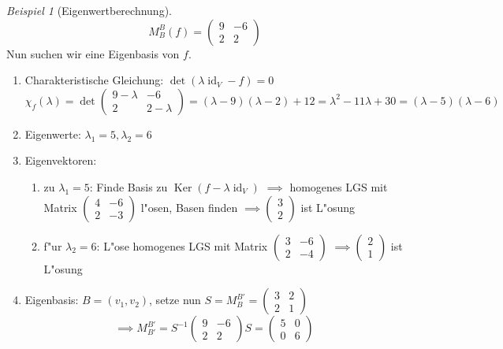 \documentclass[11pt]{article}
\DeclareMathOperator{\mKer}{Ker}
\DeclareMathOperator{\mId}{id}
\theoremstyle{remark}
\newtheorem{exa}{Beispiel}[section]
\theoremstyle{definition}
\theoremstyle{remark}
\begin{document}
\begin{exa}[Eigenwertberechnung]
  \[M^B_B(f) =
    \begin{pmatrix}
      9 & -6 \\
      2 & 2
    \end{pmatrix}\]
  Nun suchen wir eine Eigenbasis von \(f\).
  \begin{enumerate}
  \item Charakteristische Gleichung: \(\det(\lambda\mId_V-f)=0\)
    \[\chi_f(\lambda) = \det\begin{pmatrix}9-\lambda & -6 \\ 2 & 2-\lambda\end{pmatrix} = (\lambda - 9)(\lambda - 2) + 12 = \lambda^2 - 11\lambda + 30 = (\lambda-5)(\lambda-6)\]
  \item Eigenwerte: \(\lambda_1 = 5, \lambda_2 = 6\)
  \item Eigenvektoren:
    \begin{enumerate}
    \item zu \(\lambda_1 = 5\): Finde Basis zu \(\mKer(f - \lambda\mId_V)\) \(\implies\) homogenes LGS mit Matrix \(
        \begin{pmatrix}
          4 & -6 \\
          2 & -3
        \end{pmatrix}
      \) l"osen, Basen finden \(\implies\begin{pmatrix}3\\2\end{pmatrix}\) ist L"osung
    \item f"ur \(\lambda_2 = 6\): L"ose homogenes LGS mit Matrix \(
        \begin{pmatrix}
          3 & -6 \\
          2 & -4
        \end{pmatrix}
\) \(\implies\begin{pmatrix}2\\1\end{pmatrix}\) ist L"osung
\end{enumerate}
\item Eigenbasis: \(B = (v_1, v_2)\), setze nun \(S = M^{B'}_B=\begin{pmatrix}3 & 2\\ 2 & 1\end{pmatrix}\)
  \[\implies M^{B'}_{B'}=S^{-1}\begin{pmatrix}9 & -6 \\ 2 & 2 \end{pmatrix}S = \begin{pmatrix}5 & 0 \\ 0 & 6 \end{pmatrix}\]
  \end{enumerate}
\end{exa}
\end{document}

